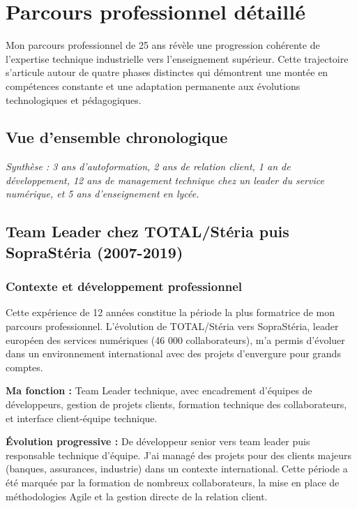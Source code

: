 \chapter{Parcours professionnel détaillé}

Mon parcours professionnel de 25 ans révèle une progression cohérente de l'expertise technique industrielle vers l'enseignement supérieur. Cette trajectoire s'articule autour de quatre phases distinctes qui démontrent une montée en compétences constante et une adaptation permanente aux évolutions technologiques et pédagogiques.

\section{Vue d'ensemble chronologique}

\begin{center}
\textit{Synthèse : 3 ans d'autoformation, 2 ans de relation client, 1 an de développement, 12 ans de management technique chez un leader du service numérique, et 5 ans d'enseignement en lycée.}
\end{center}

\section{Team Leader chez TOTAL/Stéria puis SopraStéria (2007-2019)}

\subsection{Contexte et développement professionnel}

Cette expérience de 12 années constitue la période la plus formatrice de mon parcours professionnel. L'évolution de TOTAL/Stéria vers SopraStéria, leader européen des services numériques (46 000 collaborateurs), m'a permis d'évoluer dans un environnement international avec des projets d'envergure pour grands comptes.

\textbf{Ma fonction :} Team Leader technique, avec encadrement d'équipes de développeurs, gestion de projets clients, formation technique des collaborateurs, et interface client-équipe technique.

\textbf{Évolution progressive :} De développeur senior vers team leader puis responsable technique d'équipe. J'ai managé des projets pour des clients majeurs (banques, assurances, industrie) dans un contexte international. Cette période a été marquée par la formation de nombreux collaborateurs, la mise en place de méthodologies Agile et la gestion directe de la relation client.

